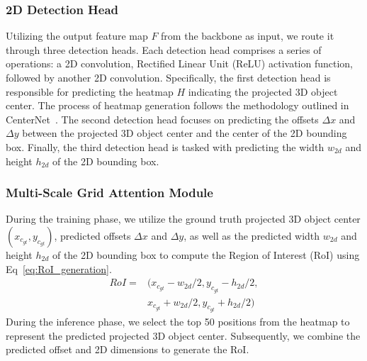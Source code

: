 \documentclass[journal]{IEEEtran}
\begin{document}
	\subsubsection{2D Detection Head}\label{2d_detection_head}
	Utilizing the output feature map $F$ from the backbone as input, we route it through three detection heads. Each detection head comprises a series of operations: a 2D convolution, Rectified Linear Unit (ReLU) activation function, followed by another 2D convolution. Specifically, the first detection head is responsible for predicting the heatmap $H$ indicating the projected 3D object center. The process of heatmap generation follows the methodology outlined in CenterNet~\cite{centernet}. The second detection head focuses on predicting the offsets $\Delta x$ and $\Delta y$ between the projected 3D object center and the center of the 2D bounding box. Finally, the third detection head is tasked with predicting the width $w_{2d}$ and height $h_{2d}$ of the 2D bounding box.
	
	\subsubsection{Multi-Scale Grid Attention Module}\label{msga}
	During the training phase, we utilize the ground truth projected 3D object center $(x_{c_{gt}}, y_{c_{gt}})$, predicted offsets $\Delta x$ and $\Delta y$, as well as the predicted width $w_{2d}$ and height $h_{2d}$ of the 2D bounding box to compute the Region of Interest (RoI) using Eq~\eqref{eq:RoI_generation}.	
	\begin{equation}
	\begin{aligned}
	RoI =& (x_{c_{gt}}-w_{2d}/2, y_{c_{gt}}-h_{2d}/2, \\
  &x_{c_{gt}}+w_{2d}/2, y_{c_{gt}}+h_{2d}/2)
	\label{eq:RoI_generation}
	\end{aligned}
	\end{equation}
	During the inference phase, we select the top 50 positions from the heatmap to represent the predicted projected 3D object center. Subsequently, we combine the predicted offset and 2D dimensions to generate the RoI.
\end{document}
